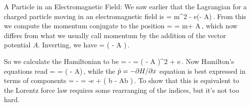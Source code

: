 A Particle in an Electromagnetic Field: We saw earlier that the Lagrangian for a charged particle moving in an electromagnetic field is
\beq
\lag = m\dt\gpvec^2 - e\left(\phi - \dt\gpvec\iprod A\right)\,.
\eeq
From this we compute the momentum conjugate to the position
\beq
\lmom = \xpd{\lag}{\dt\gpvec} = m\dt\gpvec + A\,,
\eeq
which now differs from what we usually call momentum by the addition of the vector potential $A$. Inverting, we have
\beq
\dt\gpvec = \left( \lmom - A \right)\,.
\eeq

So we calculate the Hamiltonian to be
\beq
\ham\vat{\lmom,\gpvec} = \lmom\iprod\dt\gpvec - \lag 
                       = \left( \lmom - A \right)^2 + e\phi\,.
\eeq
Now Hamilton's equations read
\beq
\dt\gpvec = \xpd{\ham}{\lmom} = \left( \lmom -  A\right)\,,
\eeq
while the $\dot{p} = -\partial H/\partial x$ equation is best expressed in terms of components
\beq
{} = - 
        = -e 
          + \left( \gmom b - \covec Ab \right)\,.
\eeq
To show that this is equivalent to the Lorentz force law requires some rearranging of the indices, but it's not too hard.


